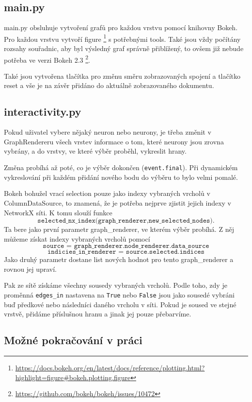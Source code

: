 \documentclass[a4paper,12pt]{article}
\begin{document}
\subsection{main.py}

main.py obsluhuje vytvoření grafů pro každou vrstvu pomocí knihovny Bokeh. Pro každou vrstvu vytvoří 
figure \footnote{\url{https://docs.bokeh.org/en/latest/docs/reference/plotting.html?highlight=figure\#bokeh.plotting.figure}}
s potřebnými tools. Také jsou vždy počítány rozsahy souřadnic, aby byl výsledný graf správně přiblížený,
to ovšem již nebude potřeba ve verzi Bokeh 2.3 \footnote{\url{https://github.com/bokeh/bokeh/issues/10472}}.

Také jsou vytvořena tlačítka pro změnu směru zobrazovaných spojení a tlačítko reset a vše je na závěr přidáno do
aktuálně zobrazovaného dokumentu.

\subsection{interactivity.py}

Pokud uživatel vybere nějaký neuron nebo neurony, je třeba změnit v GraphRendereru všech vrstev informace
o tom, které neurony jsou zrovna vybrány, a do vrstvy, ve které výběr proběhl, vykreslit hrany.

Změna probíhá až poté, co je výběr dokončen (\texttt{event.final}). Při dynamickém vykreslování při každém přidání
nového bodu do výběru to bylo velmi pomalé.

Bokeh bohužel vrací selection pouze jako indexy vybraných vrcholů v ColumnDataSource, to znamená, že je potřeba
nejprve zjistit jejich indexy v NetworkX síti. K tomu slouží funkce
$$\texttt{selected\_nx\_index(graph\_renderer,new\_selected\_nodes)}.$$
Ta bere jako první parametr graph\_renderer, ve kterém výběr probíhá. Z něj můžeme získat indexy vybraných vrcholů pomocí
$$
\texttt{source = graph\_renderer.node\_renderer.data\_source}
$$
$$
\texttt{indicies\_in\_renderer = source.selected.indices}
$$
Jako druhý parametr dostane list nových hodnot  pro tento graph\_ren\-derer a rovnou jej upraví.

Pak ze sítě získáme všechny sousedy vybraných vrcholů. Podle toho, zdy je proměnná \texttt{edges\_in} nastavena 
na \texttt{True} nebo \texttt{False} jsou jako sousedé vybráni buď předkové nebo následníci daného vrcholu v síti. 
Pokud je soused ve stejné vrstvě, přidáme příslušnou hranu a jinak jej pouze přebarvíme.

\subsection{Možné pokračování v práci}
\end{document}
